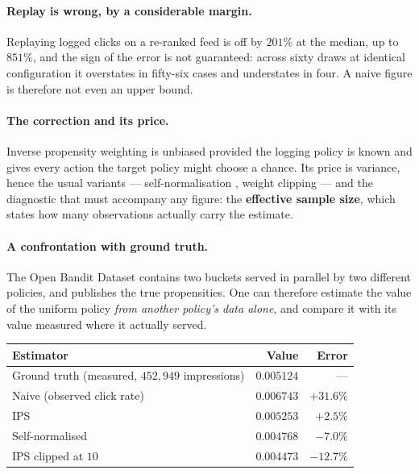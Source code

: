 \documentclass[11pt,a4paper]{article}
\begin{document}
\paragraph{Replay is wrong, by a considerable margin.} Replaying logged clicks on a re-ranked
feed is off by $201\%$ at the median, up to $851\%$, and the sign of the error is not
guaranteed: across sixty draws at identical configuration it overstates in fifty-six cases and
understates in four. A naive figure is therefore not even an upper bound.

\paragraph{The correction and its price.} Inverse propensity weighting is unbiased provided the
logging policy is known and gives every action the target policy might choose a chance. Its
price is variance, hence the usual variants --- self-normalisation \citep{swaminathan2015},
weight clipping --- and the diagnostic that must accompany any figure: the \textbf{effective
sample size}, which states how many observations actually carry the estimate.

\paragraph{A confrontation with ground truth.} The Open Bandit Dataset \citep{saito2020}
contains two buckets served in parallel by two different policies, and publishes the true
propensities. One can therefore estimate the value of the uniform policy \emph{from another
policy's data alone}, and compare it with its value measured where it actually served.

\begin{center}
\begin{tabular}{@{}lrr@{}}
\toprule
\textbf{Estimator} & \textbf{Value} & \textbf{Error} \\
\midrule
Ground truth (measured, $452{,}949$ impressions) & $0.005124$ & --- \\
Naive (observed click rate) & $0.006743$ & $+31.6\%$ \\
IPS & $0.005253$ & $\mathbf{+2.5\%}$ \\
Self-normalised & $0.004768$ & $-7.0\%$ \\
IPS clipped at $10$ & $0.004473$ & $-12.7\%$ \\
\bottomrule
\end{tabular}
\end{center}
\end{document}

